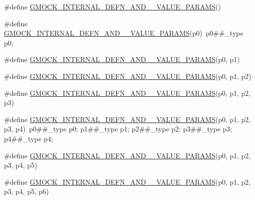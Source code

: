 \begin{DoxyCompactItemize}
\item 
\#define \mbox{\hyperlink{googletest-master_2googlemock_2include_2gmock_2gmock-generated-actions_8h_a3fef729577c726683358d924c3d31c18}{G\+M\+O\+C\+K\+\_\+\+I\+N\+T\+E\+R\+N\+A\+L\+\_\+\+D\+E\+F\+N\+\_\+\+A\+N\+D\+\_\+\_\+\+V\+A\+L\+U\+E\+\_\+\+P\+A\+R\+A\+MS}}()
\item 
\#define \mbox{\hyperlink{googletest-master_2googlemock_2include_2gmock_2gmock-generated-actions_8h_a9a2a07e6eff8e4ca6d45b8f7ea11cf3b}{G\+M\+O\+C\+K\+\_\+\+I\+N\+T\+E\+R\+N\+A\+L\+\_\+\+D\+E\+F\+N\+\_\+\+A\+N\+D\+\_\+\_\+\+V\+A\+L\+U\+E\+\_\+\+P\+A\+R\+A\+MS}}(p0)~p0\#\#\+\_\+type p0;
\item 
\#define \mbox{\hyperlink{googletest-master_2googlemock_2include_2gmock_2gmock-generated-actions_8h_a16aa4a04e77951b00534396170438deb}{G\+M\+O\+C\+K\+\_\+\+I\+N\+T\+E\+R\+N\+A\+L\+\_\+\+D\+E\+F\+N\+\_\+\+A\+N\+D\+\_\+\_\+\+V\+A\+L\+U\+E\+\_\+\+P\+A\+R\+A\+MS}}(p0,  p1)
\item 
\#define \mbox{\hyperlink{googletest-master_2googlemock_2include_2gmock_2gmock-generated-actions_8h_a584f78b5777db084208f151d7e4d51b7}{G\+M\+O\+C\+K\+\_\+\+I\+N\+T\+E\+R\+N\+A\+L\+\_\+\+D\+E\+F\+N\+\_\+\+A\+N\+D\+\_\+\_\+\+V\+A\+L\+U\+E\+\_\+\+P\+A\+R\+A\+MS}}(p0,  p1,  p2)
\item 
\#define \mbox{\hyperlink{googletest-master_2googlemock_2include_2gmock_2gmock-generated-actions_8h_a1c04daeff7ae92839f33727e264f227f}{G\+M\+O\+C\+K\+\_\+\+I\+N\+T\+E\+R\+N\+A\+L\+\_\+\+D\+E\+F\+N\+\_\+\+A\+N\+D\+\_\+\_\+\+V\+A\+L\+U\+E\+\_\+\+P\+A\+R\+A\+MS}}(p0,  p1,  p2,  p3)
\item 
\#define \mbox{\hyperlink{googletest-master_2googlemock_2include_2gmock_2gmock-generated-actions_8h_ae8e67227205c5f57cbe9c885271d8f82}{G\+M\+O\+C\+K\+\_\+\+I\+N\+T\+E\+R\+N\+A\+L\+\_\+\+D\+E\+F\+N\+\_\+\+A\+N\+D\+\_\+\_\+\+V\+A\+L\+U\+E\+\_\+\+P\+A\+R\+A\+MS}}(p0,  p1,  p2,  p3,  p4)~p0\#\#\+\_\+type p0; p1\#\#\+\_\+type p1; p2\#\#\+\_\+type p2; p3\#\#\+\_\+type p3; p4\#\#\+\_\+type p4;
\item 
\#define \mbox{\hyperlink{googletest-master_2googlemock_2include_2gmock_2gmock-generated-actions_8h_a4ba5920542abfa689a6517d21eb8860a}{G\+M\+O\+C\+K\+\_\+\+I\+N\+T\+E\+R\+N\+A\+L\+\_\+\+D\+E\+F\+N\+\_\+\+A\+N\+D\+\_\+\_\+\+V\+A\+L\+U\+E\+\_\+\+P\+A\+R\+A\+MS}}(p0,  p1,  p2,  p3,  p4,  p5)
\item 
\#define \mbox{\hyperlink{googletest-master_2googlemock_2include_2gmock_2gmock-generated-actions_8h_aa0f3292bceb484af4271eb50de9d5ead}{G\+M\+O\+C\+K\+\_\+\+I\+N\+T\+E\+R\+N\+A\+L\+\_\+\+D\+E\+F\+N\+\_\+\+A\+N\+D\+\_\+\_\+\+V\+A\+L\+U\+E\+\_\+\+P\+A\+R\+A\+MS}}(p0,  p1,  p2,  p3,  p4,  p5,  p6)

\end{DoxyCompactItemize}
